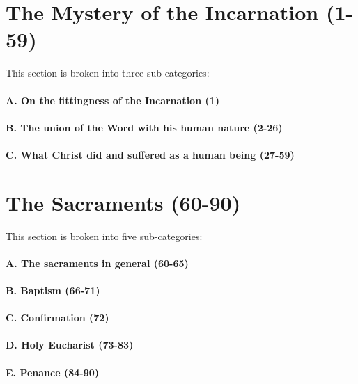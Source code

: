 \documentclass{ucetd}
\begin{document}
\section{The Mystery of the Incarnation (1-59)}
This section is broken into three sub-categories:
\paragraph{A. On the fittingness of the Incarnation (1)}

\paragraph{B. The union of the Word with his human nature (2-26)}

\paragraph{C. What Christ did and suffered as a human being (27-59)}
\clearpage

\section{The Sacraments (60-90)}
This section is broken into five sub-categories:
\paragraph{A. The sacraments in general (60-65)}

\paragraph{B. Baptism (66-71)}

\paragraph{C. Confirmation (72)}

\paragraph{D. Holy Eucharist (73-83)}

\paragraph{E. Penance (84-90)}
\printglossaries
\printbibliography
\end{document}
